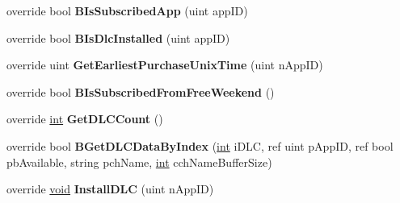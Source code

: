 \begin{DoxyCompactItemize}
\item 
\hypertarget{classValve_1_1Steamworks_1_1CSteamApps_a54461062460b7ebeb314211f23702a78}{}override bool {\bfseries B\+Is\+Subscribed\+App} (uint app\+I\+D)\label{classValve_1_1Steamworks_1_1CSteamApps_a54461062460b7ebeb314211f23702a78}

\item 
\hypertarget{classValve_1_1Steamworks_1_1CSteamApps_af059435f5861d3e39b48dd1df92a7dae}{}override bool {\bfseries B\+Is\+Dlc\+Installed} (uint app\+I\+D)\label{classValve_1_1Steamworks_1_1CSteamApps_af059435f5861d3e39b48dd1df92a7dae}

\item 
\hypertarget{classValve_1_1Steamworks_1_1CSteamApps_aab74611945daf6679d917c1252a4f79c}{}override uint {\bfseries Get\+Earliest\+Purchase\+Unix\+Time} (uint n\+App\+I\+D)\label{classValve_1_1Steamworks_1_1CSteamApps_aab74611945daf6679d917c1252a4f79c}

\item 
\hypertarget{classValve_1_1Steamworks_1_1CSteamApps_ab711fe1a3403481fd90bb4f454ececd7}{}override bool {\bfseries B\+Is\+Subscribed\+From\+Free\+Weekend} ()\label{classValve_1_1Steamworks_1_1CSteamApps_ab711fe1a3403481fd90bb4f454ececd7}

\item 
\hypertarget{classValve_1_1Steamworks_1_1CSteamApps_a39784a30272b3d4a9d72b33caaabf5cb}{}override \hyperlink{SDL__thread_8h_a6a64f9be4433e4de6e2f2f548cf3c08e}{int} {\bfseries Get\+D\+L\+C\+Count} ()\label{classValve_1_1Steamworks_1_1CSteamApps_a39784a30272b3d4a9d72b33caaabf5cb}

\item 
\hypertarget{classValve_1_1Steamworks_1_1CSteamApps_a494d578bcab8137166d976d7a9c9f043}{}override bool {\bfseries B\+Get\+D\+L\+C\+Data\+By\+Index} (\hyperlink{SDL__thread_8h_a6a64f9be4433e4de6e2f2f548cf3c08e}{int} i\+D\+L\+C, ref uint p\+App\+I\+D, ref bool pb\+Available, string pch\+Name, \hyperlink{SDL__thread_8h_a6a64f9be4433e4de6e2f2f548cf3c08e}{int} cch\+Name\+Buffer\+Size)\label{classValve_1_1Steamworks_1_1CSteamApps_a494d578bcab8137166d976d7a9c9f043}

\item 
\hypertarget{classValve_1_1Steamworks_1_1CSteamApps_a43f23607ebeff947c539bf0337e3cb9e}{}override \hyperlink{SDL__audio_8h_a52835ae37c4bb905b903cbaf5d04b05f}{void} {\bfseries Install\+D\+L\+C} (uint n\+App\+I\+D)\label{classValve_1_1Steamworks_1_1CSteamApps_a43f23607ebeff947c539bf0337e3cb9e}


\end{DoxyCompactItemize}
